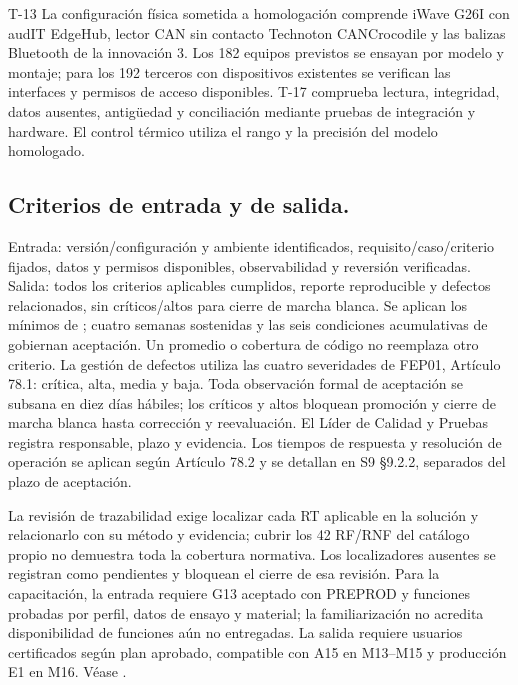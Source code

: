 \begin{formulario}{T-13}
La configuración física sometida a homologación comprende iWave G26I con audIT EdgeHub, lector CAN sin contacto Technoton CANCrocodile y las balizas Bluetooth de la innovación 3. Los 182 equipos previstos se ensayan por modelo y montaje; para los 192 terceros con dispositivos existentes se verifican las interfaces y permisos de acceso disponibles. T-17 comprueba lectura, integridad, datos ausentes, antigüedad y conciliación mediante pruebas de integración y hardware. El control térmico utiliza el rango y la precisión del modelo homologado.

\subsection*{Criterios de entrada y de salida.}\label{sec:9-t13-3}
Entrada: versión/configuración y ambiente identificados, requisito/caso/criterio fijados, datos y permisos disponibles, observabilidad y reversión verificadas. Salida: todos los criterios aplicables cumplidos, reporte reproducible y defectos relacionados, sin críticos/altos para cierre de marcha blanca. Se aplican los mínimos de ; cuatro semanas sostenidas y las seis condiciones acumulativas de  gobiernan aceptación. Un promedio o cobertura de código no reemplaza otro criterio. La gestión de defectos utiliza las cuatro severidades de FEP01, Artículo 78.1: crítica, alta, media y baja. Toda observación formal de aceptación se subsana en diez días hábiles; los críticos y altos bloquean promoción y cierre de marcha blanca hasta corrección y reevaluación. El Líder de Calidad y Pruebas registra responsable, plazo y evidencia. Los tiempos de respuesta y resolución de operación se aplican según Artículo 78.2 y se detallan en S9 §9.2.2, separados del plazo de aceptación.

La revisión de trazabilidad exige localizar cada RT aplicable en la solución y relacionarlo con su método y evidencia; cubrir los 42 RF/RNF del catálogo propio no demuestra toda la cobertura normativa. Los localizadores ausentes se registran como pendientes y bloquean el cierre de esa revisión. Para la capacitación, la entrada requiere G13 aceptado con PREPROD y funciones probadas por perfil, datos de ensayo y material; la familiarización no acredita disponibilidad de funciones aún no entregadas. La salida requiere usuarios certificados según plan aprobado, compatible con A15 en M13--M15 y producción E1 en M16. Véase .


\end{formulario}
